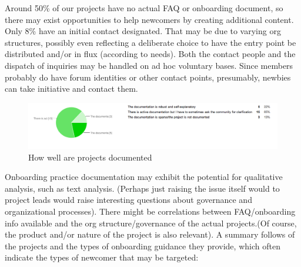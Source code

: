 Around 50\% of our projects have no actual FAQ or onboarding document, so there may exist opportunities to help newcomers by creating additional content. Only 8\% have an initial contact designated. That may be due to varying org structures, possibly even reflecting a deliberate choice to have the entry point be distributed and/or in flux (according to needs). Both the contact people and the dispatch of inquiries may be handled on ad hoc voluntary bases. Since members probably do have forum identities or other contact points, presumably, newbies can take initiative and contact them.

\begin{figure}[ht!]
\centering
\includegraphics[width=120mm]{chapters/img/documentation.png}
\caption{How well are projects documented }
\label{overflow}
\end{figure}

Onboarding practice documentation may exhibit the potential for qualitative analysis, such as text analysis. (Perhaps just raising the issue itself would to project leads would raise interesting questions about governance and organizational processes). There might be correlations between FAQ/onboarding info available and the org structure/governance of the actual projects.(Of course, the product and/or nature of the project is also relevant). A summary follows of the projects and the types of onboarding guidance they provide, which often indicate the types of newcomer that may be targeted:

